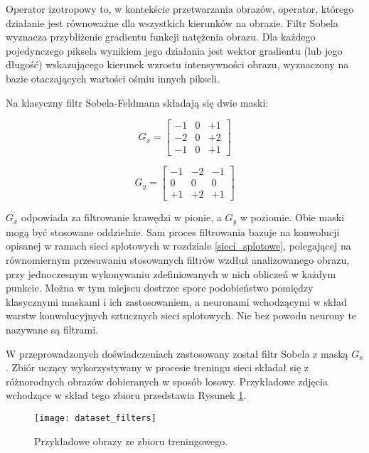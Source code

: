     Operator izotropowy to, w kontekście przetwarzania obrazów, operator, którego
    działanie jest równoważne dla wszystkich kierunków na obrazie. Filtr Sobela
    wyznacza przybliżenie gradientu funkcji natężenia obrazu. Dla każdego pojedynczego
    piksela wynikiem jego działania jest wektor gradientu (lub jego długość) wskazującego kierunek wzrostu
    intensywności obrazu, wyznaczony na bazie otaczających wartości ośmiu innych pikseli.

    Na klasyczny filtr Sobela-Feldmana składają się dwie maski:

    \[G_x =
    \begin{bmatrix}
    -1 & 0 & +1 \\
    -2 & 0 & +2 \\
    -1 & 0 & +1
    \end{bmatrix}
    \]

    \[G_y =
    \begin{bmatrix}
    -1 & -2 & -1 \\
    0 & 0 & 0 \\
    +1 & +2 & +1
    \end{bmatrix}
    \]

    $G_x$ odpowiada za filtrowanie krawędzi w pionie, a $G_y$ w poziomie. Obie maski
    mogą być stosowane oddzielnie. Sam proces filtrowania bazuje na konwolucji
    opisanej w ramach sieci splotowych w rozdziale \ref{sieci_splotowe}, polegającej na
    równomiernym przesuwaniu stosowanych filtrów wzdłuż analizowanego obrazu, przy
    jednoczesnym wykonywaniu zdefiniowanych w nich obliczeń w każdym punkcie. Można
    w tym miejscu dostrzec spore podobieństwo pomiędzy klasycznymi maskami i ich zastosowaniem,
    a neuronami wchodzącymi w skład warstw konwolucyjnych sztucznych sieci splotowych. Nie bez powodu
    neurony te nazywane są filtrami.

    W przeprowadzonych doświadczeniach zastosowany został filtr Sobela z
    maską $G_x$. Zbiór uczący wykorzystywany w procesie treningu sieci składał się
    z różnorodnych obrazów dobieranych w sposób losowy. Przykładowe zdjęcia wchodzące
    w skład tego zbioru przedstawia Rysunek \ref{fig:dataset_filters}.

    \begin{figure}[h!]
      \centering
      \texttt{[image: dataset\_filters]}
      \caption[Przykładowe obrazy ze zbioru treningowego - źródło: Rysunek własny]{Przykładowe obrazy ze zbioru treningowego.}
      \label{fig:dataset_filters}
    \end{figure}

